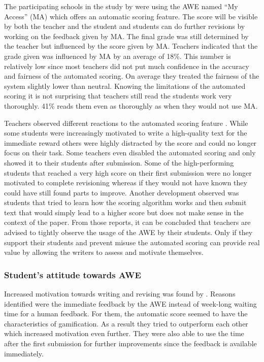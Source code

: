 \documentclass[runningheads]{llncs}
\begin{document}
The participating schools in the study by \textcite{grimes_utility_2010} were using the AWE named ``My Access'' (MA) which offers an automatic scoring feature. The score will be visible by both the teacher and the student and students can do further revisions by working on the feedback given by MA. The final grade was still determined by the teacher but influenced by the score given by MA. Teachers indicated that the grade given was influenced by MA by an average of 18\%. This number is relatively low since most teachers did not put much confidence in the accuracy and fairness of the automated scoring. On average they treated the fairness of the system slightly lower than neutral. Knowing the limitations of the automated scoring it is not surprising that teachers still read the students work very thoroughly. 41\% reads them even as thoroughly as when they would not use MA. 

Teachers observed different reactions to the automated scoring feature \citep{grimes_utility_2010}. While some students were increasingly motivated to write a high-quality text for the immediate reward others were highly distracted by the score and could no longer focus on their task. Some teachers even disabled the automated scoring and only showed it to their students after submission. Some of the high-performing students that reached a very high score on their first submission were no longer motivated to complete revisioning whereas if they would not have known they could have still found parts to improve. Another development observed was students that tried to learn how the scoring algorithm works and then submit text that would simply lead to a higher score but does not make sense in the context of the paper. From those reports, it can be concluded that teachers are advised to tightly observe the usage of the AWE by their students. Only if they support their students and prevent misuse the automated scoring can provide real value by allowing the writers to assess and motivate themselves.

\subsubsection{Student's attitude towards AWE}
Increased motivation towards writing and revising was found by \textcite{grimes_utility_2010}. Reasons identified were the immediate feedback by the AWE instead of week-long waiting time for a human feedback. For them, the automatic score seemed to have the characteristics of gamification. As a result they tried to outperform each other which increased motivation even further. They were also able to use the time after the first submission for further improvements since the feedback is available immediately.
\end{document}
